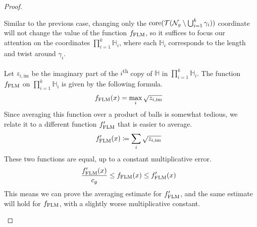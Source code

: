 \begin{proof}
\begin{enumerate}[(i)]
    Similar to the previous case, changing only the $\mathrm{core}(\mathcal{T}(\mathcal{N}_g \setminus \bigcup_{i=1}^k \gamma_i))$ coordinate will not change the value of the function $f_{\mathrm{FLM}}$, so it suffices to focus our attention on the coordinates $\prod_{i=1}^k \mathbb{H}_i$, where each $\mathbb{H}_i$ corresponds to the length and twist around $\gamma_i$.

    Let $z_{i, \mathrm{im}}$ be the imaginary part of the $i$\textsuperscript{th} copy of $\mathbb{H}$ in $\prod_{i=1}^k \mathbb{H}_i$.
    The function $f_{\mathrm{FLM}}$ on $\prod_{i=1}^k \mathbb{H}_i$ is given by the following formula.
    \begin{align*}
      f_{\mathrm{FLM}}(x) = \max_{i} \sqrt{z_{i, \mathrm{im}}}
    \end{align*}
    Since averaging this function over a product of balls is somewhat tedious, we relate it to a different function $f_{\mathrm{FLM}}^{\prime}$ that is easier to average.
    \begin{align*}
      f_{\mathrm{FLM}}^{\prime}(x) \coloneqq \sum_i \sqrt{z_{i, \mathrm{im}}}
    \end{align*}
    These two functions are equal, up to a constant multiplicative error.
    \begin{align*}
      \frac{f_{\mathrm{FLM}}^{\prime}(x)}{c_g} \leq f_{\mathrm{FLM}}(x) \leq f_{\mathrm{FLM}}^{\prime}(x)
    \end{align*}
    This means we can prove the averaging estimate for $f_{\mathrm{FLM}}^{\prime}$, and the same estimate will hold for $f_{\mathrm{FLM}}$, with a slightly worse multiplicative constant.


\end{enumerate}
\end{proof}
